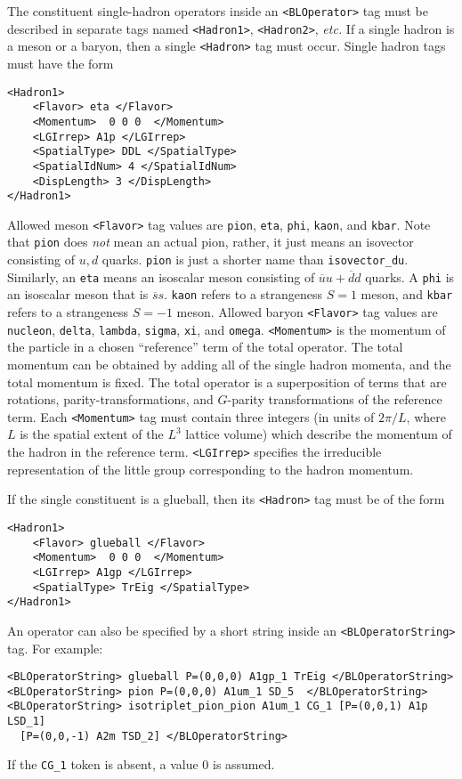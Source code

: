 \documentclass[12pt]{article}
\newcommand{\vb}{\texttt}
\begin{document}
The constituent single-hadron operators inside an \vb{<BLOperator>} tag
must be described in
separate tags named \vb{<Hadron1>}, \vb{<Hadron2>}, \textit{etc.}  If a single hadron
is a meson or a baryon, then a single \vb{<Hadron>} tag must occur.
Single hadron tags must have the form
\begin{verbatim}
<Hadron1>
    <Flavor> eta </Flavor>
    <Momentum>  0 0 0  </Momentum>
    <LGIrrep> A1p </LGIrrep>
    <SpatialType> DDL </SpatialType>
    <SpatialIdNum> 4 </SpatialIdNum>
    <DispLength> 3 </DispLength>
</Hadron1>
\end{verbatim}
Allowed meson \vb{<Flavor>} tag values are \vb{pion}, \vb{eta}, \vb{phi},
\vb{kaon}, and \vb{kbar}. Note that \vb{pion} does \textit{not} mean an actual
pion, rather, it just means an isovector consisting of $u,d$
quarks.  \vb{pion} is just a shorter name than \vb{isovector\_du}.
Similarly, an \vb{eta} means an isoscalar meson consisting of
$\overline{u}u+\overline{d}d$ quarks.  A \vb{phi} is an isoscalar meson
that is $\overline{s}s$.
\vb{kaon} refers to a strangeness $S=1$ meson, and \vb{kbar} refers
to a strangeness $S=-1$ meson. Allowed baryon \vb{<Flavor>} tag
values are \vb{nucleon}, \vb{delta}, \vb{lambda}, \vb{sigma}, \vb{xi}, and
\vb{omega}.  \vb{<Momentum>} is the momentum of the particle
in a chosen ``reference'' term of the total operator.  The
total momentum can be obtained by adding all of the single
hadron momenta, and the total momentum is fixed.  The total
operator is a superposition of terms that are rotations,
parity-transformations, and $G$-parity transformations of the
reference term. Each \vb{<Momentum>} tag must contain three
integers (in units of $2\pi/L$, where $L$ is the spatial extent of the
$L^3$ lattice volume) which describe the momentum
of the hadron in the reference term. \vb{<LGIrrep>} specifies the
irreducible representation of the little group corresponding
to the hadron momentum.

If the single constituent is a glueball, then its \vb{<Hadron>}
tag must be of the form
\begin{verbatim}
<Hadron1>
    <Flavor> glueball </Flavor>
    <Momentum>  0 0 0  </Momentum>
    <LGIrrep> A1gp </LGIrrep>
    <SpatialType> TrEig </SpatialType>
</Hadron1>
\end{verbatim}

An operator can also be specified by a short string inside an
\vb{<BLOperatorString>} tag.  For example:
\begin{verbatim}
<BLOperatorString> glueball P=(0,0,0) A1gp_1 TrEig </BLOperatorString>
<BLOperatorString> pion P=(0,0,0) A1um_1 SD_5  </BLOperatorString>
<BLOperatorString> isotriplet_pion_pion A1um_1 CG_1 [P=(0,0,1) A1p LSD_1]
  [P=(0,0,-1) A2m TSD_2] </BLOperatorString>
\end{verbatim}
If the \vb{CG\_1} token is absent, a value 0 is assumed.
\end{document}
